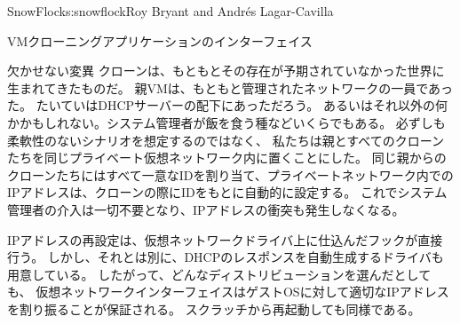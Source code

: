 \begin{aosachapter}{SnowFlock}{s:snowflock}{Roy Bryant and Andr\'e{s} Lagar-Cavilla}
\begin{aosasect1}{VMクローニングアプリケーションのインターフェイス}
\begin{aosasect2}{欠かせない変異}
クローンは、もともとその存在が予期されていなかった世界に生まれてきたものだ。
親VMは、もともと管理されたネットワークの一員であった。
たいていはDHCPサーバーの配下にあっただろう。
あるいはそれ以外の何かかもしれない。システム管理者が飯を食う種などいくらでもある。
必ずしも柔軟性のないシナリオを想定するのではなく、
私たちは親とすべてのクローンたちを同じプライベート仮想ネットワーク内に置くことにした。
同じ親からのクローンたちにはすべて一意なIDを割り当て、プライベートネットワーク内での
IPアドレスは、クローンの際にIDをもとに自動的に設定する。
これでシステム管理者の介入は一切不要となり、IPアドレスの衝突も発生しなくなる。

IPアドレスの再設定は、仮想ネットワークドライバ上に仕込んだフックが直接行う。
しかし、それとは別に、DHCPのレスポンスを自動生成するドライバも用意している。
したがって、どんなディストリビューションを選んだとしても、
仮想ネットワークインターフェイスはゲストOSに対して適切なIPアドレスを割り振ることが保証される。
スクラッチから再起動しても同様である。


\end{aosasect2}
\end{aosasect1}
\end{aosachapter}
